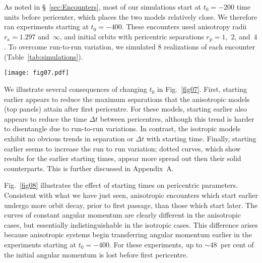 \documentclass[fleqn,usenatbib]{mnras}
\begin{document}
As noted in \S~\ref{sec:Encounters}, most of our simulations start at $t_{0} = -200$ time units before pericenter, which places the two models relatively close. We therefore ran experiments starting at $t_{0} = -400$. These encounters used anisotropy radii $r_\mathrm{a} = 1.297$ and~$\infty$, and initial orbits with pericentric separations $r_\mathrm{p} = 1$,~$2$, and~$4$. To overcome run-to-run variation, we simulated $8$ realizations of each encounter (Table~\ref{tab:simulations}).

\begin{figure*}
    \centering
    \texttt{[image: fig07.pdf]}
    \caption{Effect of starting time on radial trajectories.  Runs starting at $t_{0} = -400$ (dotted) are compared with their counterparts starting at $t_{0} = -200$ (solid); all $8$ realizations of each ensemble are plotted.   Encounters of isotropic models (bottom) behave similarily for either choice of $t_{0}$. For anisotropic models (top), starting earlier lowers the apocentric separation and reduces the merger timescale.}
    \label{fig07}
\end{figure*}

We illustrate several consequences of changing $t_{0}$ in Fig.~\ref{fig07}. First, starting earlier appears to reduce the maximum separations that the anisotropic models (top panels) attain after first pericentre. For these models, starting earlier also appears to reduce the time $\Delta t$ between pericentres, although this trend is harder to disentangle due to run-to-run variations. In contrast, the isotropic models exhibit no obvious trends in separation or $\Delta t$ with starting time. Finally, starting earlier seems to increase the run to run variation; dotted curves, which show results for the earlier starting times, appear more spread out then their solid counterparts. This is further discussed in Appendix~A.

Fig.~\ref{fig08} illustrates the effect of starting times on pericentric parameters. Consistent with what we have just seen, anisotropic encounters which start earlier undergo more orbit decay, prior to first passage, than those which start later. The curves of constant angular momentum are clearly different in the anisotropic cases, but essentially indistinguishable in the isotropic cases. This difference arises because anisotropic systems begin transferring angular momentum earlier in the experiments starting at $t_{0}=-400$. For these experiments, up to $\sim 48$~per cent of the initial angular momentum is lost before first pericentre.
\end{document}
